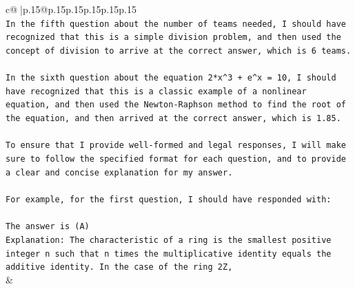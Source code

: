 \documentclass{article}
\begin{document}
{\begin{supertabular}{c@{$\;$}|p{.15\linewidth}@{}p{.15\linewidth}p{.15\linewidth}p{.15\linewidth}p{.15\linewidth}p{.15\linewidth}}
{{{\\ 
\texttt{In the fifth question about the number of teams needed, I should have recognized that this is a simple division problem, and then used the concept of division to arrive at the correct answer, which is 6 teams.} \\
\\ 
\texttt{In the sixth question about the equation 2*x\^{}3 + e\^{}x = 10, I should have recognized that this is a classic example of a nonlinear equation, and then used the Newton{-}Raphson method to find the root of the equation, and then arrived at the correct answer, which is 1.85.} \\
\\ 
\texttt{To ensure that I provide well{-}formed and legal responses, I will make sure to follow the specified format for each question, and to provide a clear and concise explanation for my answer.} \\
\\ 
\texttt{For example, for the first question, I should have responded with:} \\
\\ 
\texttt{The answer is (A)} \\
\texttt{Explanation: The characteristic of a ring is the smallest positive integer n such that n times the multiplicative identity equals the additive identity. In the case of the ring 2Z,} \\
            }
        }
    }
    & \\ \\

\end{supertabular}
}
\end{document}
